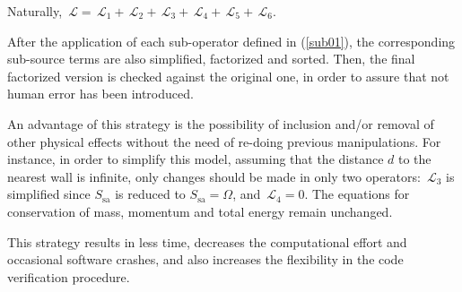 \documentclass[10pt]{article}
\newcommand{\Lo}{\,\mathcal{L}}
\newcommand{\tsa}{\mathrm{sa}}
\begin{document}
Naturally, $\Lo=\Lo_1+\Lo_2+\Lo_3+\Lo_4+\Lo_5+\Lo_6.$


 After the application of each sub-operator defined in (\ref{sub01}), the corresponding sub-source terms are also simplified, factorized and sorted. Then, the final factorized version is checked against the original one, in order to assure that not human error has been introduced.

An advantage of this strategy is the possibility of inclusion and/or removal of other physical effects without the need of re-doing previous manipulations. For instance, in order to simplify this model, assuming that the distance $d$ to the nearest wall is infinite, only changes should be made in only two operators:  $\Lo_3$ is simplified since $S_\tsa$ is reduced to $S_\tsa=\Omega$, and $\Lo_4=0$. The equations for conservation  of mass, momentum and total energy remain unchanged.


This strategy results in less time, decreases the computational effort and occasional software crashes, and also increases the flexibility in the code verification procedure.
\end{document}
